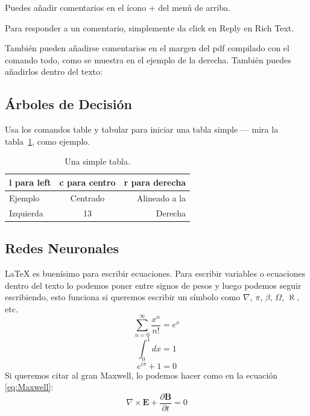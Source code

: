 \documentclass[12pt]{article}
\begin{document}
Puedes añadir comentarios en el ícono + del menú de arriba.

Para responder a un comentario, simplemente da click en Reply en Rich Text.


También pueden añadirse comentarios en el margen del pdf compilado con el comando todo, como se muestra en el ejemplo de la derecha. También puedes añadirlos dentro del texto:

\subsection{Árboles de Decisión}

Usa los comandos table y tabular para iniciar una tabla simple --- mira la tabla~\ref{tab:tabla ejemplo}, como ejemplo. 

\begin{table}
\centering
\begin{tabular}{l c r} 
l para left & c para centro & r para derecha \\ \hline
Ejemplo & Centrado & Alineado a la\\
Izquierda & 13 & Derecha
\end{tabular}
\caption{\label{tab:tabla ejemplo}Una simple tabla.}
\end{table}

\subsection{Redes Neuronales}

\LaTeX{} es buenísimo para escribir ecuaciones. Para escribir variables o ecuaciones dentro del texto lo podemos poner entre signos de pesos y luego podemos seguir escribiendo, esto funciona si queremos escribir un símbolo como $\nabla$, $\pi$, $\beta$, $\Omega$, $\aleph$, etc.
\begin{equation}
\sum_{n=0}^\infty \frac{x^n}{n!}=e^x
\end{equation}
\begin{equation}
\int_{0}^{1}dx=1
\end{equation}
\begin{equation}
e^{i\pi}+1=0
\end{equation}
Si queremos citar al gran Maxwell, lo podemos hacer como en la ecuación \ref{eq:Maxwell}:
\begin{equation}
\nabla\times\mathbf{E}+\frac{\partial\mathbf{B}}{\partial t}=0\label{eq:Maxwell}
\end{equation}
\end{document}
